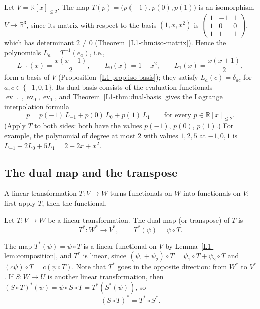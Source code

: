\begin{example}\label{L1-ex:lagrange}
    Let $V = \mathbb{R}[x]_{\leq 2}$. The map $T(p) = \big(p(-1), p(0), p(1)\big)$ is an isomorphism $V \to \mathbb{R}^3$, since its matrix with respect to the basis $(1, x, x^2)$ is $\begin{pmatrix} 1 & -1 & 1 \\ 1 & 0 & 0 \\ 1 & 1 & 1 \end{pmatrix}$, which has determinant $2 \neq 0$ (Theorem~\ref{L1-thm:iso-matrix}). Hence the polynomials $L_a = T^{-1}(e_a)$, i.e.,
    \[L_{-1}(x) = \frac{x(x - 1)}{2}, \qquad L_0(x) = 1 - x^2, \qquad L_1(x) = \frac{x(x + 1)}{2},\]
    form a basis of $V$ (Proposition~\ref{L1-prop:iso-basis}); they satisfy $L_a(c) = \delta_{ac}$ for $a, c \in \{-1, 0, 1\}$. Its dual basis consists of the evaluation functionals $\operatorname{ev}_{-1}, \operatorname{ev}_0, \operatorname{ev}_1$, and Theorem~\ref{L1-thm:dual-basis} gives the Lagrange interpolation formula
    \[p = p(-1)\, L_{-1} + p(0)\, L_0 + p(1)\, L_1 \qquad \text{for every } p \in \mathbb{R}[x]_{\leq 2}.\]
    (Apply $T$ to both sides: both have the values $p(-1)$, $p(0)$, $p(1)$.) For example, the polynomial of degree at most $2$ with values $1, 2, 5$ at $-1, 0, 1$ is $L_{-1} + 2L_0 + 5L_1 = 2 + 2x + x^2$.
\end{example}

\subsection{The dual map and the transpose}

A linear transformation $T: V \to W$ turns functionals on $W$ into functionals on $V$: first apply $T$, then the functional.

\begin{definition}
    Let $T: V \to W$ be a linear transformation. The dual map (or transpose) of $T$ is
    \[T^*: W^* \to V^*, \qquad T^*(\psi) = \psi \circ T.\]
\end{definition}

The map $T^*(\psi) = \psi \circ T$ is a linear functional on $V$ by Lemma~\ref{L1-lem:composition}, and $T^*$ is linear, since $(\psi_1 + \psi_2) \circ T = \psi_1 \circ T + \psi_2 \circ T$ and $(c\psi) \circ T = c(\psi \circ T)$. Note that $T^*$ goes in the opposite direction: from $W^*$ to $V^*$. If $S: W \to U$ is another linear transformation, then $(S \circ T)^*(\psi) = \psi \circ S \circ T = T^*(S^*(\psi))$, so
\[(S \circ T)^* = T^* \circ S^*.\]

